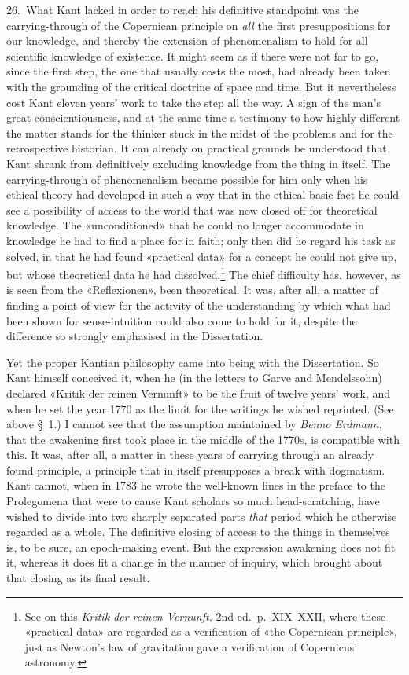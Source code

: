 \documentclass[12pt,a4paper]{article}
\newcommand{\opage}[1]{\marginnote{\footnotesize\textit{[#1]}}}
\begin{document}
26.\ What Kant lacked in order to reach his definitive standpoint was the
carrying-through of the Copernican principle on \emph{all} the first presuppositions
for our knowledge, and thereby the extension of phenomenalism to hold for all
scientific knowledge of existence. It might seem as if there were not far to
go, since the first step, the one that usually costs the most, had already
been taken with the grounding of the critical doctrine of space and time. But
it nevertheless cost Kant eleven years' work to take the step all the way. A
sign of the man's great conscientiousness, and at the same time a testimony
to how highly different the matter stands for the thinker stuck in the midst
of the problems and for the retrospective historian. It can already on
practical grounds be understood that Kant shrank from definitively excluding
knowledge from the thing in itself. The carrying-through of phenomenalism
became possible for him only when his ethical theory had developed in such a
way that in the ethical basic fact he could see a possibility of access to the
world that was now closed off for theoretical knowledge. The «unconditioned»
that he could no longer accommodate in knowledge he had to find a place for
in faith; only then did he regard his task as solved, in that he had found
«practical data» for a concept he could not give up, but whose theoretical
data he had dissolved.\footnote{See on this \textit{Kritik der reinen
Vernunft.} 2nd ed.\ p.\ XIX--XXII, where these «practical data» are regarded
as a verification of «the Copernican principle», just as Newton's law of
gravitation gave a verification of Copernicus' astronomy.} The chief
difficulty has, however, as is seen from the «Reflexionen», been theoretical.
It was, after all, a matter of finding a point of view for the activity of the
understanding by which what had been shown for sense-intuition could also come
to hold for it, despite the difference so strongly emphasised in the
Dissertation.

Yet the proper Kantian philosophy came into being with the Dissertation. So
Kant himself conceived it, when he (in the letters to Garve and Mendelssohn)
declared «Kritik der reinen Vernunft» to be the fruit of twelve years' work,
and when he set the year 1770 as the limit for the writings he wished
reprinted. (See above §\ 1.) I cannot see that the assumption maintained by
\emph{Benno Erdmann}, that the awakening first took place in the middle of the
1770s, is compatible with this. It was, after all, a matter in these years of
carrying through an already found principle, a principle that in itself
presupposes a break with dogmatism. Kant cannot, when in 1783 he wrote the
well-known lines in the preface to the Prolegomena that were to cause Kant
scholars so much head-scratching, have wished to divide into two sharply
separated parts \emph{that} period which he otherwise regarded as a whole. The
definitive closing of access to the things in themselves is, to be sure, an
epoch-making event. But the expression awakening \opage{52}does not fit it, whereas it
does fit a change in the manner of inquiry, which brought about that closing
as its final result.
\end{document}
